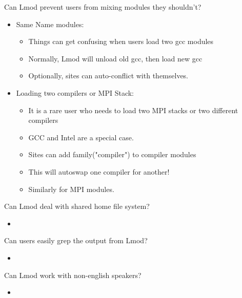 \documentclass{beamer}
\begin{document}
\begin{frame}{Can Lmod prevent users from mixing modules they shouldn't?}
  \begin{itemize}
      \item Same Name modules:
      \begin{itemize}
        \item Things can get confusing when users load two gcc modules
        \item Normally, Lmod will unload old gcc, then load new gcc
        \item Optionally, sites can auto-conflict with themselves.
      \end{itemize}
    \item Loading two compilers or MPI Stack:
      \begin{itemize}
        \item It is a rare user who needs to load two MPI stacks or
          two different compilers
        \item GCC and Intel are a special case.
        \item Sites can add family("compiler") to compiler modules
        \item This will autoswap one compiler for another!
        \item Similarly for MPI modules.
      \end{itemize}
  \end{itemize}
\end{frame}

\begin{frame}{Can Lmod deal with shared home file system?}
  \begin{itemize}
    \item 
  \end{itemize}
\end{frame}

\begin{frame}{Can users easily grep the output from Lmod?}
  \begin{itemize}
    \item 
  \end{itemize}
\end{frame}

\begin{frame}{Can Lmod work with non-english speakers?}
  \begin{itemize}
    \item 
  \end{itemize}
\end{frame}
\end{document}
